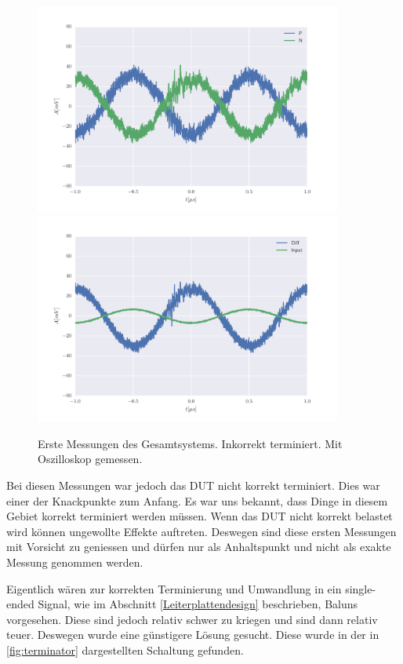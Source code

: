 \begin{figure}[H]
\begin{center}
    \includegraphics[width=0.9\textwidth]{data/images/messungen/zweite_messung_NP}
    \includegraphics[width=0.9\textwidth]{data/images/messungen/zweite_messung_INOUT}
    \caption{Erste Messungen des Gesamtsystems. Inkorrekt terminiert. Mit Oszilloskop gemessen.}
    \label{fig:messungen_zweite}
\end{center}
\end{figure}

Bei diesen Messungen war jedoch das DUT nicht korrekt terminiert. Dies war einer der Knackpunkte zum Anfang. Es war uns bekannt, dass Dinge in diesem Gebiet korrekt terminiert werden müssen. Wenn das DUT nicht korrekt belastet wird können ungewollte Effekte auftreten. Deswegen sind diese ersten Messungen mit Vorsicht zu geniessen und dürfen nur als Anhaltspunkt und nicht als exakte Messung genommen werden.

Eigentlich wären zur korrekten Terminierung und Umwandlung in ein single-ended Signal, wie im Abschnitt \ref{Leiterplattendesign} beschrieben, Baluns vorgesehen. Diese sind jedoch relativ schwer zu kriegen und sind dann relativ teuer. Deswegen wurde eine günstigere Lösung gesucht. Diese wurde in der in \ref{fig:terminator} dargestellten Schaltung gefunden.

